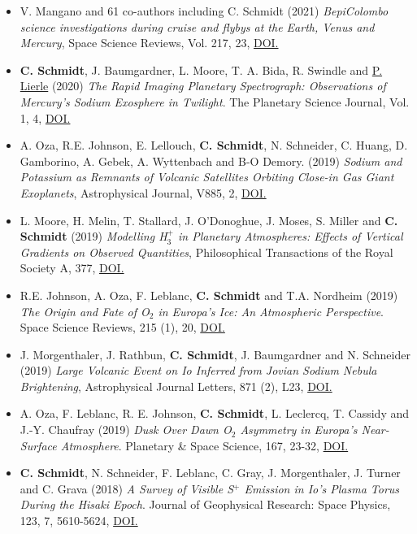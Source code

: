 \documentclass[12pt]{report}
\begin{document}
\begin{itemize}
  \item V. Mangano and 61 co-authors including C. Schmidt (2021) \textit{BepiColombo science investigations during cruise and flybys at the Earth, Venus and Mercury}, Space Science Reviews, Vol. 217, 23, \href{https://doi.org/10.1007/s11214-021-00797-9}{DOI.} 
  \item \textbf{C. Schmidt}, J. Baumgardner, L. Moore, T. A. Bida, R. Swindle and \underline{P. Lierle} (2020) \textit{The Rapid Imaging Planetary Spectrograph: Observations of Mercury's Sodium Exosphere in Twilight}. The Planetary Science Journal, Vol. 1, 4, \href{https://doi.org/10.3847/PSJ/ab76c9}{DOI.}
  \item A. Oza, R.E. Johnson, E. Lellouch, \textbf{C. Schmidt}, N. Schneider, C. Huang, D. Gamborino, A. Gebek, A. Wyttenbach and B-O Demory. (2019) \textit{Sodium and Potassium as Remnants of Volcanic Satellites Orbiting Close-in Gas Giant Exoplanets}, Astrophysical Journal, V885, 2, \href{https://doi.org/10.3847/1538-4357/ab40cc}{DOI.}
  \item L. Moore, H. Melin, T. Stallard, J. O'Donoghue, J. Moses, S. Miller and \textbf{C. Schmidt} (2019) \textit{Modelling H$_3^+$ in Planetary Atmospheres: Effects of Vertical Gradients on Observed Quantities}, Philosophical Transactions of the Royal Society A, 377, \href{https://doi.org/10.1098/rsta.2019.0067}{DOI.}
  \item R.E. Johnson, A. Oza, F. Leblanc,  \textbf{C. Schmidt} and T.A. Nordheim (2019) \textit{The Origin and Fate of O$_2$ in Europa's Ice: An Atmospheric Perspective}. Space Science Reviews, 215 (1), 20, \href{https://doi.org/10.1007/s11214-019-0582-1}{DOI.}
  \item J. Morgenthaler, J. Rathbun, \textbf{C. Schmidt}, J. Baumgardner and N. Schneider (2019) \textit{Large Volcanic Event on Io Inferred from Jovian Sodium Nebula Brightening}, Astrophysical Journal Letters, 871 (2), L23, \href{https://doi.org/10.3847/2041-8213/aafdb7}{DOI.}
  \item A. Oza, F. Leblanc, R. E. Johnson, \textbf{C. Schmidt}, L. Leclercq, T. Cassidy and J.-Y. Chaufray (2019) \textit{Dusk Over Dawn O$_2$ Asymmetry in Europa's Near-Surface Atmosphere}. Planetary \& Space Science, 167, 23-32, \href{https://doi.org/10.1016/j.pss.2019.01.006}{DOI.}
  \item \textbf{C. Schmidt}, N. Schneider, F. Leblanc, C. Gray, J. Morgenthaler, J. Turner and C. Grava (2018) \textit{A Survey of Visible S$^+$ Emission in Io's Plasma Torus During the Hisaki Epoch}. Journal of Geophysical Research: Space Physics, 123, 7, 5610-5624, \href{https://doi.org/10.1029/2018JA025296}{DOI.}

\end{itemize}
\end{document}
